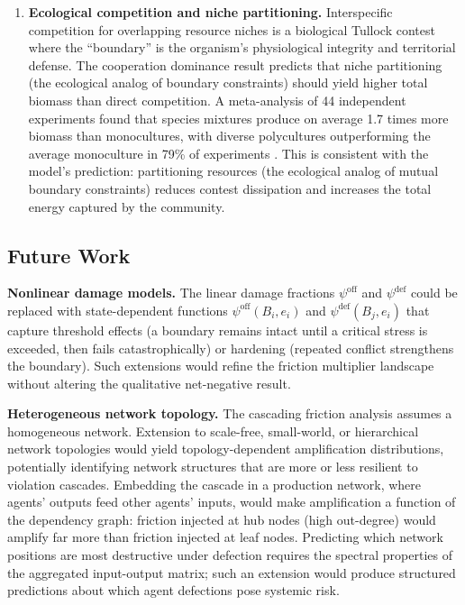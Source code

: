 \documentclass[11pt]{article}
\theoremstyle{plain}
\theoremstyle{definition}
\theoremstyle{remark}
\let\origsubsection\subsection
\renewcommand{\subsection}{\needspace{7\baselineskip}\origsubsection}
\begin{document}
\begin{enumerate}
  consistently costs multiples of the bypassed security investment,
  confirming \(\kappa > 1\) in this domain. The network cascading result
  (Theorem~\ref{thm-cascading-friction}) predicts that a single
  compromised node in a supply chain propagates friction across all
  dependent systems. \citet{Crosignani2023} document this effect in the
  2017 NotPetya attack: disruptions at directly compromised firms
  propagated through supply chains to their customers, with aggregate
  downstream losses approximately four times larger than the direct
  losses to the initially targeted firms.
\item
  \textbf{Ecological competition and niche partitioning.} Interspecific
  competition for overlapping resource niches is a biological Tullock
  contest where the ``boundary'' is the organism's physiological
  integrity and territorial defense. The cooperation dominance result
  predicts that niche partitioning (the ecological analog of boundary
  constraints) should yield higher total biomass than direct
  competition. A meta-analysis of 44 independent experiments found that
  species mixtures produce on average 1.7 times more biomass than
  monocultures, with diverse polycultures outperforming the average
  monoculture in 79\% of experiments \citep{Cardinale2007}. This is
  consistent with the model's prediction: partitioning resources (the
  ecological analog of mutual boundary constraints) reduces contest
  dissipation and increases the total energy captured by the community.
\end{enumerate}

\subsection{Future Work}\label{future-work}

\textbf{Nonlinear damage models.} The linear damage fractions
\(\psi^{\text{off}}\) and \(\psi^{\text{def}}\) could be replaced with
state-dependent functions \(\psi^{\text{off}}(B_i, e_i)\) and
\(\psi^{\text{def}}(B_j, e_i)\) that capture threshold effects (a
boundary remains intact until a critical stress is exceeded, then fails
catastrophically) or hardening (repeated conflict strengthens the
boundary). Such extensions would refine the friction multiplier
landscape without altering the qualitative net-negative result.

\textbf{Heterogeneous network topology.} The cascading friction analysis
assumes a homogeneous network. Extension to scale-free, small-world, or
hierarchical network topologies would yield topology-dependent
amplification distributions, potentially identifying network structures
that are more or less resilient to violation cascades. Embedding the
cascade in a production network, where agents' outputs feed other
agents' inputs, would make amplification a function of the dependency
graph: friction injected at hub nodes (high out-degree) would amplify
far more than friction injected at leaf nodes. Predicting which network
positions are most destructive under defection requires the spectral
properties of the aggregated input-output matrix; such an extension
would produce structured predictions about which agent defections pose
systemic risk.
\end{document}
